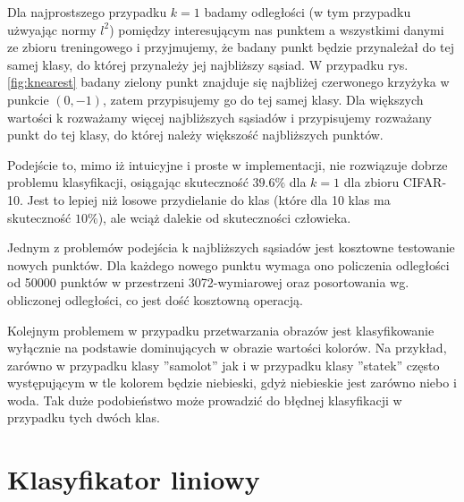 Dla najprostszego przypadku $k=1$ badamy odległości (w tym przypadku użwyając normy $l^2$) pomiędzy interesującym nas punktem a wszystkimi danymi ze zbioru treningowego i przyjmujemy, że badany punkt będzie przynależał do tej samej klasy, do której przynależy jej najbliższy sąsiad.
W przypadku rys. \ref{fig:knearest} badany zielony punkt znajduje się najbliżej czerwonego krzyżyka w punkcie $(0,-1)$, zatem przypisujemy go do tej samej klasy.
Dla większych wartości k rozważamy więcej najbliższych sąsiadów i przypisujemy rozważany punkt do tej klasy, do której należy większość najbliższych punktów.

Podejście to, mimo iż intuicyjne i proste w implementacji, nie rozwiązuje dobrze problemu klasyfikacji, osiągając skuteczność $39.6\%$ dla $k = 1$ dla zbioru CIFAR-10.
Jest to lepiej niż losowe przydielanie do klas (które dla 10 klas ma skuteczność $10\%$), ale wciąż dalekie od skuteczności człowieka.

Jednym z problemów podejścia k najbliższych sąsiadów jest kosztowne testowanie nowych punktów.
Dla każdego nowego punktu wymaga ono policzenia odległości od 50000 punktów w przestrzeni 3072-wymiarowej oraz posortowania wg. obliczonej odległości, co jest dość kosztowną operacją.

Kolejnym problemem w przypadku przetwarzania obrazów jest klasyfikowanie wyłącznie na podstawie dominujących w obrazie wartości kolorów.
Na przykład, zarówno w przypadku klasy ''samolot'' jak i w przypadku klasy ''statek'' często występującym w tle kolorem będzie niebieski, gdyż niebieskie jest zarówno niebo i woda.
Tak duże podobieństwo może prowadzić do błędnej klasyfikacji w przypadku tych dwóch klas. \cite{cs231n}

\section{Klasyfikator liniowy}

